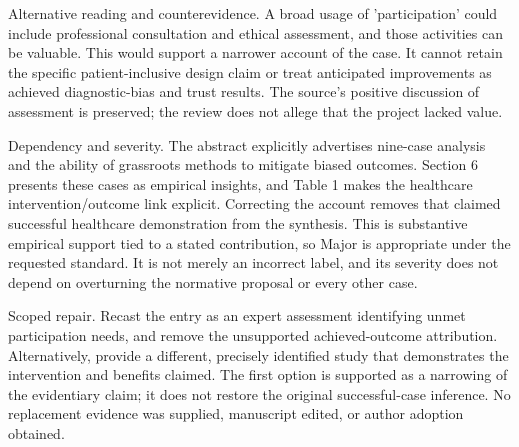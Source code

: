 \documentclass[10pt]{article}
\begin{document}
Alternative reading and counterevidence. A broad usage of ’participation’ could include professional consultation and ethical assessment, and those activities can be valuable. This would support a narrower account of the case. It cannot retain the specific patient-inclusive design claim or treat anticipated improvements as achieved diagnostic-bias and trust results. The source’s positive discussion of assessment is preserved; the review does not allege that the project lacked value.\par
Dependency and severity. The abstract explicitly advertises nine-case analysis and the ability of grassroots methods to mitigate biased outcomes. Section 6 presents these cases as empirical insights, and Table 1 makes the healthcare intervention/outcome link explicit. Correcting the account removes that claimed successful healthcare demonstration from the synthesis. This is substantive empirical support tied to a stated contribution, so Major is appropriate under the requested standard. It is not merely an incorrect label, and its severity does not depend on overturning the normative proposal or every other case.\par
Scoped repair. Recast the entry as an expert assessment identifying unmet participation needs, and remove the unsupported achieved-outcome attribution. Alternatively, provide a different, precisely identified study that demonstrates the intervention and benefits claimed. The first option is supported as a narrowing of the evidentiary claim; it does not restore the original successful-case inference. No replacement evidence was supplied, manuscript edited, or author adoption obtained.\par
\end{document}
